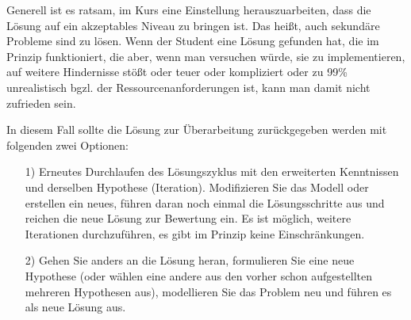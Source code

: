 \documentclass[11pt,a4paper]{article}
\begin{document}
Generell ist es ratsam, im Kurs eine Einstellung herauszuarbeiten, dass die
Lösung auf ein akzeptables Niveau zu bringen ist. Das heißt, auch sekundäre
Probleme sind zu lösen.  Wenn der Student eine Lösung gefunden hat, die im
Prinzip funktioniert, die aber, wenn man versuchen würde, sie zu
implementieren, auf weitere Hindernisse stößt oder teuer oder kompliziert oder
zu 99\% unrealistisch bgzl. der Ressourcenanforderungen ist, kann man damit
nicht zufrieden sein.

In diesem Fall sollte die Lösung zur Überarbeitung zurückgegeben werden mit
folgenden zwei Optionen:
\begin{itemize}
\item [1)] Erneutes Durchlaufen des Lösungszyklus mit den erweiterten
  Kenntnissen und derselben Hypothese (Iteration).  Modifizieren Sie das
  Modell oder erstellen ein neues, führen daran noch einmal die
  Lösungsschritte aus und reichen die neue Lösung zur Bewertung ein. Es ist
  möglich, weitere Iterationen durchzuführen, es gibt im Prinzip keine
  Einschränkungen.
\enlargethispage{-1em}
\item [2)] Gehen Sie anders an die Lösung heran, formulieren Sie eine neue
  Hypothese (oder wählen eine andere aus den vorher schon aufgestellten
  mehreren Hypothesen aus), modellieren Sie das Problem neu und führen es als
  neue Lösung aus.
\end{itemize}
\end{document}
